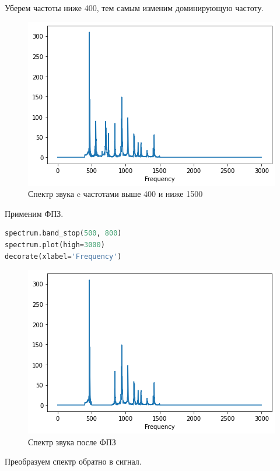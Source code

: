 Уберем частоты ниже 400, тем самым изменим доминирующую частоту.

\begin{figure}[H]
	\begin{center}
		\includegraphics[scale=1]{fig/lab01/lab01_4.png}
		\caption{Спектр звука c частотами выше 400 и ниже 1500}
	\end{center}
\end{figure}

Применим ФПЗ.

\begin{lstlisting}[language=Python]
spectrum.band_stop(500, 800)
spectrum.plot(high=3000)
decorate(xlabel='Frequency')
\end{lstlisting}

\begin{figure}[H]
	\begin{center}
		\includegraphics[scale=1]{fig/lab01/lab01_5.png}
		\caption{Спектр звука после ФПЗ}
	\end{center}
\end{figure}

Преобразуем спектр обратно в сигнал.

